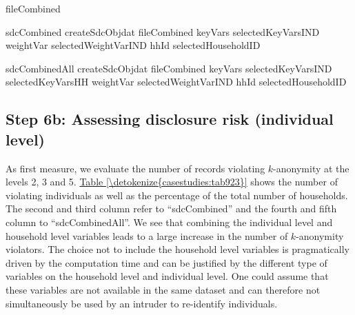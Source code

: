\documentclass[letterpaper,10pt,english]{sphinxmanual}
\begin{document}
\begin{sphinxVerbatim}[commandchars=\\\{\},numbers=left,firstnumber=1,stepnumber=1]
fileCombined

sdcCombined  createSdcObjdat  fileCombined keyVars  selectedKeyVarsIND
                            weightVar  selectedWeightVarIND hhId  selectedHouseholdID

sdcCombinedAll  createSdcObjdat  fileCombined
                               keyVars  selectedKeyVarsIND selectedKeyVarsHH 
                               weightVar  selectedWeightVarIND hhId  selectedHouseholdID
\end{sphinxVerbatim}


\subsection{Step 6b: Assessing disclosure risk (individual level)}
\label{\detokenize{casestudies:id13}}
As first measure, we evaluate the number of records violating
\(k\)-anonymity at the levels 2, 3 and 5. \hyperref[\detokenize{casestudies:tab923}]{Table \ref{\detokenize{casestudies:tab923}}} shows the
number of violating individuals as well as the percentage of the total
number of households. The second and third column refer to “sdcCombined”
and the fourth and fifth column to “sdcCombinedAll”. We see that
combining the individual level and household level variables leads to a
large increase in the number of \(k\)-anonymity violators. The
choice not to include the household level variables is pragmatically
driven by the computation time and can be justified by the different
type of variables on the household level and individual level. One could
assume that these variables are not available in the same dataset and
can therefore not simultaneously be used by an intruder to re-identify
individuals.
\end{document}
